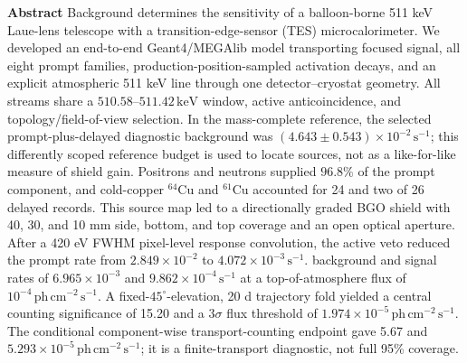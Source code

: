 \documentclass[11pt]{article}
\newcommand{\keV}{\ensuremath{\,\mathrm{keV}}}
\newcommand{\phcms}{\ensuremath{\,\mathrm{ph\,cm^{-2}\,s^{-1}}}}
\newcommand{\cps}{\ensuremath{\,\mathrm{s^{-1}}}}
\begin{document}
\noindent\textbf{Abstract}\hspace{0.7em}
Background determines the sensitivity of a balloon-borne 511 keV Laue-lens
telescope with a transition-edge-sensor (TES) microcalorimeter. We developed an
end-to-end Geant4/MEGAlib model transporting focused signal, all eight prompt
families, production-position-sampled activation decays, and an explicit
atmospheric 511 keV line through one detector--cryostat geometry. All streams
share a $510.58$--$511.42\keV$ window, active anticoincidence, and
topology/field-of-view selection. In the mass-complete reference, the selected
prompt-plus-delayed diagnostic background was $(4.643\pm0.543)\times10^{-2}\cps$;
this differently scoped reference budget is used to locate sources, not as a
like-for-like measure of shield gain. Positrons and neutrons supplied
$96.8\%$ of the prompt component, and cold-copper $^{64}$Cu and $^{61}$Cu
accounted for 24 and two of 26 delayed records. This source map led to a
directionally graded BGO shield with 40, 30, and 10 mm side, bottom, and top
coverage and an open optical aperture. After a 420 eV FWHM pixel-level response
convolution, the active veto reduced the prompt rate from
$2.849\times10^{-2}$ to $4.072\times10^{-3}\cps$. 
background and signal rates of $6.965\times10^{-3}$ and
$9.862\times10^{-4}\cps$ at a top-of-atmosphere flux of $10^{-4}\phcms$. A
fixed-$45^\circ$-elevation, 20 d trajectory fold yielded a central counting
significance of 15.20 and a $3\sigma$ flux threshold of
$1.974\times10^{-5}\phcms$. The conditional component-wise transport-counting
endpoint gave 5.67 and $5.293\times10^{-5}\phcms$; it is a finite-transport
diagnostic, not full 95\% coverage.
\end{document}
